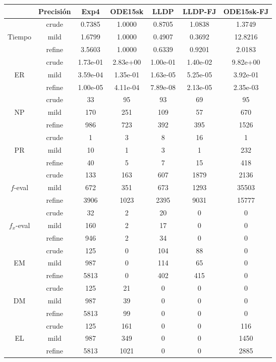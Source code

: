 \begin{table}[htb]
\centering
\begin{tabular}{ |c|c|c|c|c|c|c| }
\hline
 & Precisi\'on & Exp4 & ODE15sk & LLDP & LLDP-FJ & ODE15sk-FJ \\
\hline
  & crude & 0.7385 & 1.0000 & 0.8705 & 1.0838 & 1.3749 \\
 Tiempo  & mild & 1.6799 & 1.0000 & 0.4907 & 0.3692 & 12.8216 \\
  & refine & 3.5603 & 1.0000 & 0.6339 & 0.9201 & 2.0183 \\
\hline
  & crude & 1.73e-01 & 2.83e+00 & 1.00e-01 & 1.40e-02 & 9.82e+00 \\
 ER  & mild & 3.59e-04 & 1.35e-01 & 1.63e-05 & 5.25e-05 & 3.92e-01 \\
  & refine & 1.00e-05 & 4.11e-04 & 7.89e-08 & 2.13e-05 & 2.35e-03 \\
\hline
  & crude & 33 & 95 & 93 & 69 & 95 \\
 NP  & mild & 170 & 251 & 109 & 57 & 670 \\
  & refine & 986 & 723 & 392 & 395 & 1526 \\
\hline
  & crude & 1 & 3 & 8 & 16 & 1 \\
 PR  & mild & 10 & 1 & 3 & 1 & 232 \\
  & refine & 40 & 5 & 7 & 15 & 418 \\
\hline
  & crude & 133 & 163 & 607 & 1879 & 2136 \\
 $f$-eval  & mild & 672 & 351 & 673 & 1293 & 35503 \\
  & refine & 3906 & 1023 & 2395 & 9031 & 15777 \\
\hline
  & crude & 32 & 2 & 20 & 0 & 0 \\
 $f_x$-eval  & mild & 160 & 2 & 17 & 0 & 0 \\
  & refine & 946 & 2 & 34 & 0 & 0 \\
\hline
  & crude & 125 & 0 & 104 & 88 & 0 \\
 EM  & mild & 987 & 0 & 114 & 65 & 0 \\
  & refine & 5813 & 0 & 402 & 415 & 0 \\
\hline
  & crude & 125 & 21 & 0 & 0 & 0 \\
 DM  & mild & 987 & 39 & 0 & 0 & 0 \\
  & refine & 5813 & 99 & 0 & 0 & 0 \\
\hline
  & crude & 125 & 161 & 0 & 0 & 116 \\
 EL  & mild & 987 & 349 & 0 & 0 & 1450 \\
  & refine & 5813 & 1021 & 0 & 0 & 2885 \\

\end{tabular}
\end{table}

